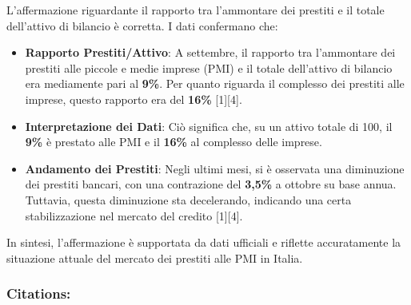 \documentclass[
  letterpaper,
  DIV=11,
  numbers=noendperiod]{scrartcl}
\begin{document}
L'affermazione riguardante il rapporto tra l'ammontare dei prestiti e il
totale dell'attivo di bilancio è corretta. I dati confermano che:

\begin{itemize}
\item
  \textbf{Rapporto Prestiti/Attivo}: A settembre, il rapporto tra
  l'ammontare dei prestiti alle piccole e medie imprese (PMI) e il
  totale dell'attivo di bilancio era mediamente pari al \textbf{9\%}.
  Per quanto riguarda il complesso dei prestiti alle imprese, questo
  rapporto era del \textbf{16\%} {[}1{]}{[}4{]}.
\item
  \textbf{Interpretazione dei Dati}: Ciò significa che, su un attivo
  totale di 100, il \textbf{9\%} è prestato alle PMI e il \textbf{16\%}
  al complesso delle imprese.
\item
  \textbf{Andamento dei Prestiti}: Negli ultimi mesi, si è osservata una
  diminuzione dei prestiti bancari, con una contrazione del
  \textbf{3,5\%} a ottobre su base annua. Tuttavia, questa diminuzione
  sta decelerando, indicando una certa stabilizzazione nel mercato del
  credito {[}1{]}{[}4{]}.
\end{itemize}

\begin{tcolorbox}[enhanced jigsaw, coltitle=black, colbacktitle=quarto-callout-warning-color!10!white, bottomtitle=1mm, colback=white, bottomrule=.15mm, breakable, arc=.35mm, opacitybacktitle=0.6, toprule=.15mm, left=2mm, colframe=quarto-callout-warning-color-frame, title=\textcolor{quarto-callout-warning-color}{\faExclamationTriangle}\hspace{0.5em}{Conclusione}, titlerule=0mm, toptitle=1mm, rightrule=.15mm, leftrule=.75mm, opacityback=0]

In sintesi, l'affermazione è supportata da dati ufficiali e riflette
accuratamente la situazione attuale del mercato dei prestiti alle PMI in
Italia.

\end{tcolorbox}

\subsubsection{Citations:}\label{citations-1}
\end{document}
